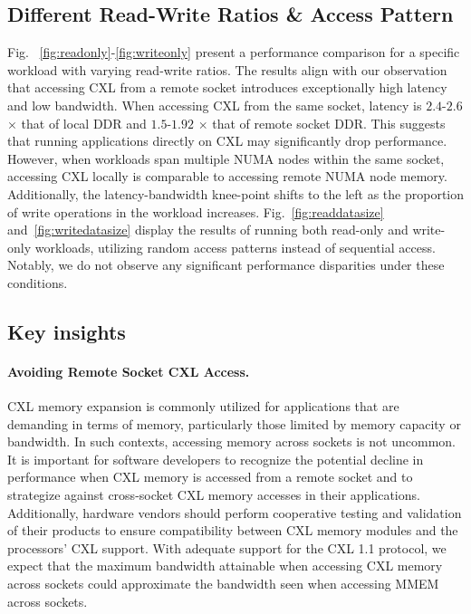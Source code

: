 \subsection{Different Read-Write Ratios \& Access Pattern}

Fig. ~\ref{fig:readonly}-\ref{fig:writeonly} present a performance comparison for a specific workload with varying read-write ratios. The results align with our observation that accessing CXL from a remote socket introduces exceptionally high latency and low bandwidth.
When accessing CXL from the same socket, latency is $2.4$-$2.6$ $\times$ that of local DDR and $1.5$-$1.92$ $\times$ that of remote socket DDR.
This suggests that running applications directly on CXL may significantly drop performance.
However, when workloads span multiple NUMA nodes within the same socket, accessing CXL locally is comparable to accessing remote NUMA node memory.
Additionally, the latency-bandwidth knee-point shifts to the left as the proportion of write operations in the workload increases.
Fig.~\ref{fig:readdatasize} and~\ref{fig:writedatasize} display the results of running both read-only and write-only workloads, utilizing random access patterns instead of sequential access. Notably, we do not observe any significant performance disparities under these conditions.

\subsection{Key insights}
\paragraph{Avoiding Remote Socket CXL Access.}
CXL memory expansion is commonly utilized for applications that are demanding in terms of memory, particularly those limited by memory capacity or bandwidth. In such contexts, accessing memory across sockets is not uncommon. It is important for software developers to recognize the potential decline in performance when CXL memory is accessed from a remote socket and to strategize against cross-socket CXL memory accesses in their applications. Additionally, hardware vendors should perform cooperative testing and validation of their products to ensure compatibility between CXL memory modules and the processors' CXL support. With adequate support for the CXL 1.1 protocol, we expect that the maximum bandwidth attainable when accessing CXL memory across sockets could approximate the bandwidth seen when accessing MMEM across sockets.

